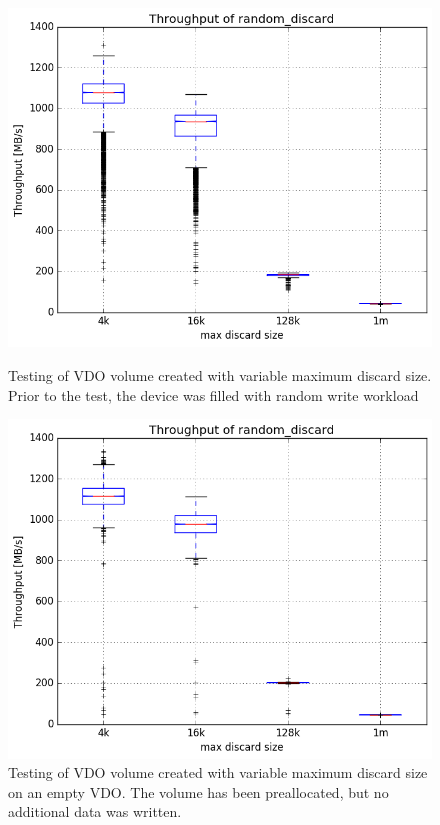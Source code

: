 \documentclass[
  color, %
  table, %
  lof,   %
  lot,   %
]{fithesis3}
\begin{document}
\begin{figure}[!htb]
        \centering
        \includegraphics[width=\textwidth]{../results/discards/full_VDO/report/random_discard1_compare_boxplots}
\caption[Testing of VDO volume created with variable maximum discard size]{Testing of VDO volume created with variable maximum discard size. Prior to the test, the device was filled with random write workload}
\label{fig:discard-full}
        \centering        
        \includegraphics[width=\textwidth]{../results/discards/empty_VDO/report/random_discard1_compare_boxplots}
\caption[Testing of VDO volume created with variable maximum discard size on an empty VDO]{Testing of VDO volume created with variable maximum discard size on an empty VDO. The volume has been preallocated, but no additional data was written.}
\label{fig:discard-empty}
\end{figure}
\end{document}

